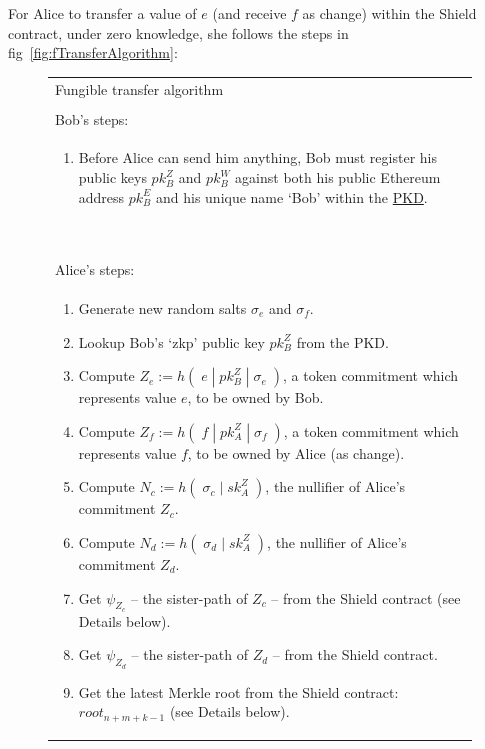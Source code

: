 \documentclass{article}
\newcounter{ongoingEnumCounter}%
\begin{document}
For Alice to transfer a value of $e$ (and receive $f$ as change) within the Shield contract, under zero knowledge, she follows the steps in fig~\ref{fig:fTransferAlgorithm}:

\newpage
\begin{figure}[H]
  \ContinuedFloat*
	\begin{center}
		\begin{framed}
      \begin{tabular}{p{16cm}}
        Fungible transfer algorithm \\
        \\
        \hline
        Bob's steps:\\
        \begin{enumerate}
          \item Before Alice can send him anything, Bob must register his public keys $pk_B^Z$ and $pk_B^W$ against both his public Ethereum address $pk_B^E$ and his unique name `Bob' within the \hyperref[sec:pkd]{PKD}.
          \setcounter{ongoingEnumCounter}{\value{enumi}}
        \end{enumerate}
        \ \\
        \hline
        Alice's steps:\\
        \begin{enumerate}
          \setcounter{enumi}{\value{ongoingEnumCounter}}
          \item Generate new random salts $\sigma_e$ and $\sigma_f$.
          \item Lookup Bob's `zkp' public key $pk_B^Z$ from the PKD.
          \item Compute $Z_e := h(\;e\;|\;pk^Z_B\;|\;\sigma_e\;)$, a token commitment which represents value $e$, to be owned by Bob.
          \item Compute $Z_f := h(\;f\;|\;pk^Z_A\;|\;\sigma_f\;)$, a token commitment which represents value $f$, to be owned by Alice (as change).
          \item Compute $N_c := h(\;\sigma_c\;|\;sk^Z_A\;)$, the nullifier of Alice's commitment $Z_c$.
          \item Compute $N_d := h(\;\sigma_d\;|\;sk^Z_A\;)$, the nullifier of Alice's commitment $Z_d$.
          \item Get $\psi_{Z_c}$ -- the sister-path of $Z_c$ -- from the Shield contract (see Details below).
          \item Get $\psi_{Z_d}$ -- the sister-path of $Z_d$ -- from the Shield contract.
          \item Get the latest Merkle root from the Shield contract: $root_{n+m+k-1}$ (see Details below).

\end{enumerate}
\end{tabular}
\end{framed}
\end{center}
\end{figure}
\end{document}
